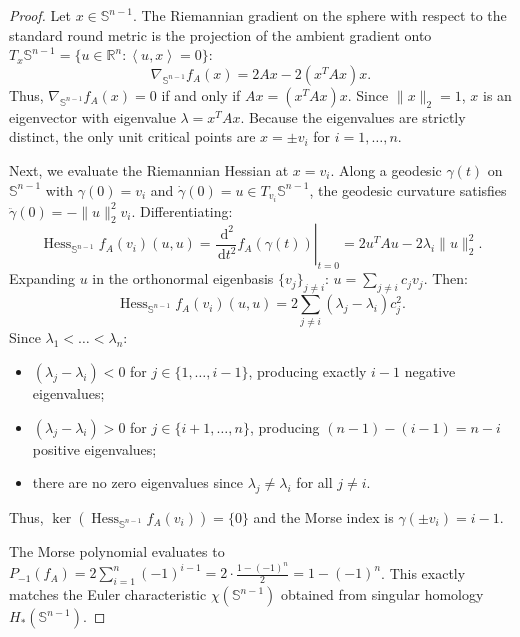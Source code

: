 \documentclass[11pt,a4paper,reqno]{amsart}
\theoremstyle{definition}
\numberwithin{equation}{section}
\newcommand{\R}{\mathbb{R}}
\newcommand{\Sph}{\mathbb{S}}
\newcommand{\inner}[2]{\left\langle #1, #2 \right\rangle}
\newcommand{\dif}{\,\mathrm{d}}
\begin{document}
\begin{proof}
Let $x \in \Sph^{n-1}$. The Riemannian gradient on the sphere with respect to the standard round metric is the projection of the ambient gradient onto $T_x \Sph^{n-1} = \{u \in \R^n \colon \inner{u}{x} = 0\}$:
\begin{equation}
    \nabla_{\Sph^{n-1}} f_A(x) = 2 A x - 2(x^T A x) x.
\end{equation}
Thus, $\nabla_{\Sph^{n-1}} f_A(x) = 0$ if and only if $Ax = (x^T Ax) x$. Since $\|x\|_2=1$, $x$ is an eigenvector with eigenvalue $\lambda = x^T Ax$. Because the eigenvalues are strictly distinct, the only unit critical points are $x = \pm v_i$ for $i=1, \dots, n$.

Next, we evaluate the Riemannian Hessian at $x = v_i$. Along a geodesic $\gamma(t)$ on $\Sph^{n-1}$ with $\gamma(0) = v_i$ and $\dot{\gamma}(0) = u \in T_{v_i} \Sph^{n-1}$, the geodesic curvature satisfies $\ddot{\gamma}(0) = -\|u\|_2^2 v_i$. Differentiating:
\begin{equation}
    \operatorname{Hess}_{\Sph^{n-1}} f_A(v_i)(u, u) = \left.\frac{\dif^2}{\dif t^2} f_A(\gamma(t))\right|_{t=0} = 2 u^T A u - 2 \lambda_i \|u\|_2^2.
\end{equation}
Expanding $u$ in the orthonormal eigenbasis $\{v_j\}_{j \neq i}$: $u = \sum_{j \ne i} c_j v_j$. Then:
\begin{equation}
    \operatorname{Hess}_{\Sph^{n-1}} f_A(v_i)(u, u) = 2 \sum_{j \ne i} (\lambda_j - \lambda_i) c_j^2.
\end{equation}
Since $\lambda_1 < \dots < \lambda_n$:
\begin{itemize}
    \item $(\lambda_j - \lambda_i) < 0$ for $j \in \{1, \dots, i-1\}$, producing exactly $i-1$ negative eigenvalues;
    \item $(\lambda_j - \lambda_i) > 0$ for $j \in \{i+1, \dots, n\}$, producing $(n-1) - (i-1) = n - i$ positive eigenvalues;
    \item there are no zero eigenvalues since $\lambda_j \ne \lambda_i$ for all $j \ne i$.
\end{itemize}
Thus, $\ker(\operatorname{Hess}_{\Sph^{n-1}} f_A(v_i)) = \{0\}$ and the Morse index is $\gamma(\pm v_i) = i - 1$. 

The Morse polynomial evaluates to $P_{-1}(f_A) = 2 \sum_{i=1}^n (-1)^{i-1} = 2 \cdot \frac{1 - (-1)^n}{2} = 1 - (-1)^n$. This exactly matches the Euler characteristic $\chi(\Sph^{n-1})$ obtained from singular homology $H_*(\Sph^{n-1})$.
\end{proof}
\end{document}
